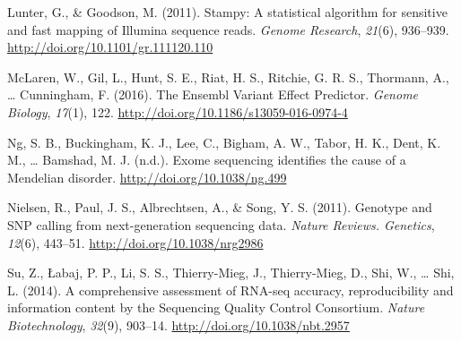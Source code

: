 \documentclass[12pt,twoside]{reedthesis}
\theoremstyle{definition}
\theoremstyle{definition}
\theoremstyle{remark}
\begin{document}
  \hypertarget{ref-Lunter2011}{}
  Lunter, G., \& Goodson, M. (2011). Stampy: A statistical algorithm for
  sensitive and fast mapping of Illumina sequence reads. \emph{Genome
  Research}, \emph{21}(6), 936--939.
  \url{http://doi.org/10.1101/gr.111120.110}
  
  \hypertarget{ref-McLaren2016}{}
  McLaren, W., Gil, L., Hunt, S. E., Riat, H. S., Ritchie, G. R. S.,
  Thormann, A., \ldots{} Cunningham, F. (2016). The Ensembl Variant Effect
  Predictor. \emph{Genome Biology}, \emph{17}(1), 122.
  \url{http://doi.org/10.1186/s13059-016-0974-4}
  
  \hypertarget{ref-Ng}{}
  Ng, S. B., Buckingham, K. J., Lee, C., Bigham, A. W., Tabor, H. K.,
  Dent, K. M., \ldots{} Bamshad, M. J. (n.d.). Exome sequencing identifies
  the cause of a Mendelian disorder. \url{http://doi.org/10.1038/ng.499}
  
  \hypertarget{ref-Nielsen2011}{}
  Nielsen, R., Paul, J. S., Albrechtsen, A., \& Song, Y. S. (2011).
  Genotype and SNP calling from next-generation sequencing data.
  \emph{Nature Reviews. Genetics}, \emph{12}(6), 443--51.
  \url{http://doi.org/10.1038/nrg2986}
  
  \hypertarget{ref-Su2014}{}
  Su, Z., Łabaj, P. P., Li, S. S., Thierry-Mieg, J., Thierry-Mieg, D.,
  Shi, W., \ldots{} Shi, L. (2014). A comprehensive assessment of RNA-seq
  accuracy, reproducibility and information content by the Sequencing
  Quality Control Consortium. \emph{Nature Biotechnology}, \emph{32}(9),
  903--14. \url{http://doi.org/10.1038/nbt.2957}


\end{document}
